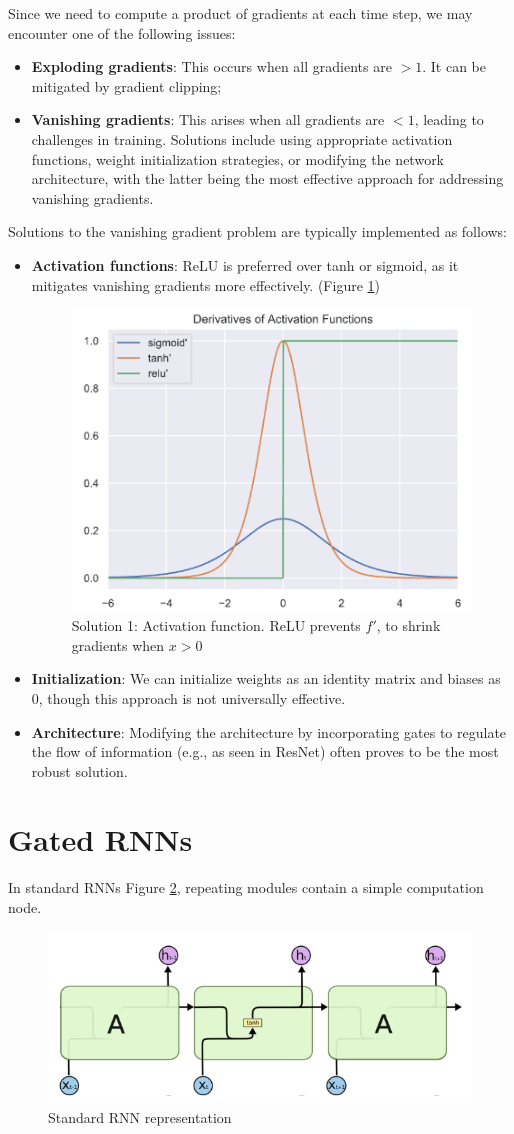 Since we need to compute a product of gradients at each time step, we may encounter
one of the following issues:
\begin{itemize}
    \item \textbf{Exploding gradients}: This occurs when all gradients are $> 1$.
          It can be mitigated by gradient clipping;
    \item \textbf{Vanishing gradients}: This arises when all gradients are $< 1$,
          leading to challenges in training. Solutions include using appropriate
          activation functions, weight initialization strategies, or modifying
          the network architecture, with the latter being the most effective
          approach for addressing vanishing gradients.
\end{itemize}

Solutions to the vanishing gradient problem are typically implemented as follows:
\begin{itemize}
    \item \textbf{Activation functions}: ReLU is preferred over tanh or sigmoid,
          as it mitigates vanishing gradients more effectively. (Figure \ref{fig:activation})
          \begin{figure}[!ht]
              \centering
              \includegraphics[width=0.3\linewidth]{img/RNN/derivatives.png}
              \caption{Solution 1: Activation function. ReLU prevents $f'$, to
                  shrink gradients when $x > 0$}
              \label{fig:activation}
          \end{figure}
    \item \textbf{Initialization}: We can initialize weights as an identity matrix
          and biases as 0, though this approach is not universally effective.
    \item \textbf{Architecture}: Modifying the architecture by incorporating gates
          to regulate the flow of information (e.g., as seen in ResNet) often
          proves to be the most robust solution.
\end{itemize}
\section{Gated RNNs}
In standard RNNs Figure \ref{fig:sRNN}, repeating modules contain a simple
computation node.
\begin{figure}[!ht]
    \centering
    \includegraphics[width=0.5\linewidth]{img/RNN/sRNN.png}
    \caption{Standard RNN representation}
    \label{fig:sRNN}
\end{figure}

